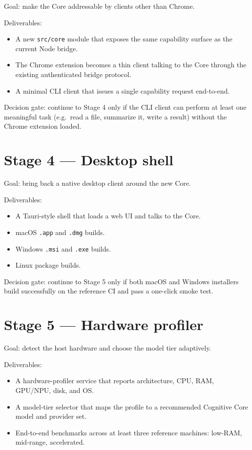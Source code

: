 Goal: make the Core addressable by clients other than Chrome.

Deliverables:
\begin{itemize}
  \item A new \texttt{src/core} module that exposes the same
        capability surface as the current Node bridge.
  \item The Chrome extension becomes a thin client talking to the
        Core through the existing authenticated bridge protocol.
  \item A minimal CLI client that issues a single capability
        request end-to-end.
\end{itemize}

Decision gate: continue to Stage 4 only if the CLI client can
perform at least one meaningful task (e.g.\ read a file, summarize
it, write a result) without the Chrome extension loaded.

\section{Stage 4 --- Desktop shell}

Goal: bring back a native desktop client around the new Core.

Deliverables:
\begin{itemize}
  \item A Tauri-style shell that loads a web UI and talks to the
        Core.
  \item macOS \texttt{.app} and \texttt{.dmg} builds.
  \item Windows \texttt{.msi} and \texttt{.exe} builds.
  \item Linux package builds.
\end{itemize}

Decision gate: continue to Stage 5 only if both macOS and Windows
installers build successfully on the reference CI and pass a
one-click smoke test.

\section{Stage 5 --- Hardware profiler}

Goal: detect the host hardware and choose the model tier adaptively.

Deliverables:
\begin{itemize}
  \item A hardware-profiler service that reports architecture, CPU,
        RAM, GPU/NPU, disk, and OS.
  \item A model-tier selector that maps the profile to a recommended
        Cognitive Core model and provider set.
  \item End-to-end benchmarks across at least three reference
        machines: low-RAM, mid-range, accelerated.
\end{itemize}

